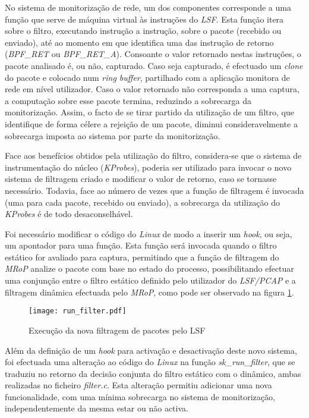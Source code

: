 No sistema de monitorização de rede, um dos componentes corresponde a uma função que serve de máquina virtual às instruções do \textit{LSF}.
Esta função itera sobre o filtro, executando instrução a instrução, sobre o pacote (recebido ou enviado), até ao momento em que identifica uma das instrução de retorno (\textit{BPF\_RET} ou \textit{BPF\_RET\_A}).
Consoante o valor retornado nestas instruções, o pacote analisado é, ou não, capturado.
Caso seja capturado, é efectuado um \textit{clone} do pacote e colocado num \textit{ring buffer}, partilhado com a aplicação monitora de rede em nível utilizador.
Caso o valor retornado não corresponda a uma captura, a computação sobre esse pacote termina, reduzindo a sobrecarga da monitorização.
Assim, o facto de se tirar partido da utilização de um filtro, que identifique de forma célere a rejeição de um pacote, diminui consideravelmente a sobrecarga imposta ao sistema por parte da monitorização.

Face aos benefícios obtidos pela utilização do filtro, considera-se que o sistema de instrumentação do núcleo (\textit{KProbes}), poderia ser utilizado para invocar o novo sistema de filtragem criado e modificar o valor de retorno, caso se tornasse necessário.
Todavia, face ao número de vezes que a função de filtragem é invocada (uma para cada pacote, recebido ou enviado), a sobrecarga da utilização do \textit{KProbes} é de todo desaconselhável.

Foi necessário modificar o código do \textit{Linux} de modo a inserir um \textit{hook}, ou seja, um apontador para uma função.
Esta função será invocada quando o filtro estático for avaliado para captura, permitindo que a função de filtragem do \textit{MRoP} analize o pacote com base no estado do processo, possibilitando efectuar uma conjunção entre o filtro estático definido pelo utilizador do \textit{LSF/PCAP} e a filtragem dinâmica efectuada pelo \textit{MRoP}, como pode ser observado na figura \ref{fig:run_filter}.

\begin{figure}[!ht]
\centering
\texttt{[image: run\_filter.pdf]}
\caption{Execução da nova filtragem de pacotes pelo LSF}
\label{fig:run_filter}
\end{figure}

Além da definição de um \textit{hook} para activação e desactivação deste novo sistema, foi efectuada uma alteração ao código do \textit{Linux} na função \textit{sk\_run\_filter}, que se traduziu no retorno da decisão conjunta do filtro estático com o dinâmico, ambas realizadas no ficheiro \textit{filter.c}.
Esta alteração permitiu adicionar uma nova funcionalidade, com uma mínima sobrecarga no sistema de monitorização, independentemente da mesma estar ou não activa.

